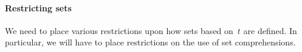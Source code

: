 

\paragraph{Restricting sets}

We need to place various restrictions upon how sets based on~$t$ are defined.
In particular, we will have to place restrictions on the use of set
comprehensions. 

